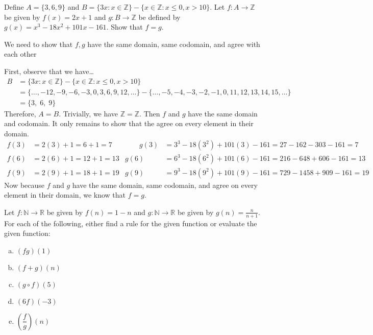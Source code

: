 \documentclass[11pt,letterpaper]{article}
\begin{document}
\newpage



 Define $A= \{ 3, 6, 9 \}$ and $B= \{ 3x \colon x \in \mathbb{Z} \} - \{ x \in \mathbb{Z} \colon x \leq 0, x > 10 \}$. Let $f: A \to \mathbb{Z}$ be given by $f(x)= 2x + 1$ and $g: B \to \mathbb{Z}$ be defined by $g(x)= x^3 - 18x^2 + 101x - 161$. Show that $f= g$. \pspace

\sol We need to show that $f, g$ have the same domain, same codomain, and agree with each other 

First, observe that we have\dots
	\[
	\begin{aligned}
	B&= \{ 3x \colon x \in \mathbb{Z} \} - \{ x \in \mathbb{Z} \colon x \leq 0, x > 10 \} \\[0.3cm]
	&= \{ \ldots, -12, -9, -6, -3, 0, 3, 6, 9, 12, \ldots \}  - \{ \ldots, -5, -4, -3, -2, -1, 0, 11, 12, 13, 14, 15, \ldots \} \\[0.3cm]
	&= \{ 3, \; 6, \; 9 \} 
	\end{aligned}
	\]
Therefore, $A= B$. Trivially, we have $\mathbb{Z}= \mathbb{Z}$. Then $f$ and $g$ have the same domain and codomain. It only remains to show that the agree on every element in their domain. 
	\[
	\begin{aligned}
	f(3)&= 2(3) + 1= 6 + 1= 7 &\qquad g(3)&=  3^3 - 18(3^2) + 101(3) - 161=  27 - 162 - 303 - 161= 7 \\
	f(6)&= 2(6) + 1= 12 + 1= 13 & g(6)&=  6^3 - 18(6^2) + 101(6) - 161=  216 - 648 + 606 - 161= 13 \\
	f(9)&= 2(9) + 1= 18 + 1= 19 & g(9)&=  9^3 - 18(9^2) + 101(9) - 161= 729 - 1458 + 909 - 161= 19 
	\end{aligned}
	\]
Now because $f$ and $g$ have the same domain, same codomain, and agree on every element in their domain, we know that $f= g$. 



\newpage



 Let $f: \mathbb{N} \to \mathbb{R}$ be given by $f(n)= 1 - n$ and $g: \mathbb{N} \to \mathbb{R}$ be given by $g(n)= \frac{n}{n + 1}$. For each of the following, either find a rule for the given function or evaluate the given function:
	\begin{enumerate}[(a)]
	\item $(fg)(1)$
	\item $(f + g)(n)$
	\item $(g \circ f)(5)$
	\item $(6f)(-3)$
	\item $\left( \dfrac{f}{g} \right)(n)$
	\end{enumerate} \pspace
\end{document}
